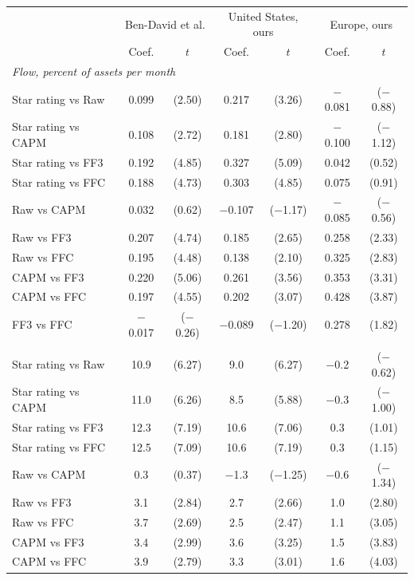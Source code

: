 \begin{tabular}{lcccccc}
\toprule
 & \multicolumn{2}{c}{Ben-David et al.} & \multicolumn{2}{c}{United States, ours} & \multicolumn{2}{c}{Europe, ours} \\
 & Coef. & $t$ & Coef. & $t$ & Coef. & $t$ \\
\midrule
\multicolumn{7}{l}{\textit{Flow, percent of assets per month}} \\
Star rating vs Raw & 0.099 & (2.50) & 0.217 & (3.26) & $-$0.081 & ($-$0.88) \\
Star rating vs CAPM & 0.108 & (2.72) & 0.181 & (2.80) & $-$0.100 & ($-$1.12) \\
Star rating vs FF3 & 0.192 & (4.85) & 0.327 & (5.09) & 0.042 & (0.52) \\
Star rating vs FFC & 0.188 & (4.73) & 0.303 & (4.85) & 0.075 & (0.91) \\
Raw vs CAPM & 0.032 & (0.62) & $-$0.107 & ($-$1.17) & $-$0.085 & ($-$0.56) \\
Raw vs FF3 & 0.207 & (4.74) & 0.185 & (2.65) & 0.258 & (2.33) \\
Raw vs FFC & 0.195 & (4.48) & 0.138 & (2.10) & 0.325 & (2.83) \\
CAPM vs FF3 & 0.220 & (5.06) & 0.261 & (3.56) & 0.353 & (3.31) \\
CAPM vs FFC & 0.197 & (4.55) & 0.202 & (3.07) & 0.428 & (3.87) \\
FF3 vs FFC & $-$0.017 & ($-$0.26) & $-$0.089 & ($-$1.20) & 0.278 & (1.82) \\
\addlinespace
\multicolumn{7}{l}{\textit{Flow, USD million per month}} \\
Star rating vs Raw & 10.9 & (6.27) & 9.0 & (6.27) & $-$0.2 & ($-$0.62) \\
Star rating vs CAPM & 11.0 & (6.26) & 8.5 & (5.88) & $-$0.3 & ($-$1.00) \\
Star rating vs FF3 & 12.3 & (7.19) & 10.6 & (7.06) & 0.3 & (1.01) \\
Star rating vs FFC & 12.5 & (7.09) & 10.6 & (7.19) & 0.3 & (1.15) \\
Raw vs CAPM & 0.3 & (0.37) & $-$1.3 & ($-$1.25) & $-$0.6 & ($-$1.34) \\
Raw vs FF3 & 3.1 & (2.84) & 2.7 & (2.66) & 1.0 & (2.80) \\
Raw vs FFC & 3.7 & (2.69) & 2.5 & (2.47) & 1.1 & (3.05) \\
CAPM vs FF3 & 3.4 & (2.99) & 3.6 & (3.25) & 1.5 & (3.83) \\
CAPM vs FFC & 3.9 & (2.79) & 3.3 & (3.01) & 1.6 & (4.03) \\

\end{tabular}
